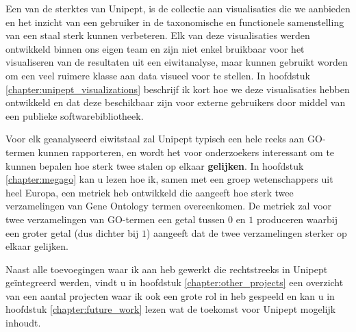 Een van de sterktes van Unipept, is de collectie aan visualisaties die we aanbieden en het inzicht van een gebruiker in de taxonomische en functionele samenstelling van een staal sterk kunnen verbeteren.
Elk van deze visualisaties werden ontwikkeld binnen ons eigen team en zijn niet enkel bruikbaar voor het visualiseren van de resultaten uit een eiwitanalyse, maar kunnen gebruikt worden om een veel ruimere klasse aan data visueel voor te stellen.
In hoofdstuk \ref{chapter:unipept_visualizations} beschrijf ik kort hoe we deze visualisaties hebben ontwikkeld en dat deze beschikbaar zijn voor externe gebruikers door middel van een publieke softwarebibliotheek.

Voor elk geanalyseerd eiwitstaal zal Unipept typisch een hele reeks aan GO-termen kunnen rapporteren, en wordt het voor onderzoekers interessant om te kunnen bepalen hoe sterk twee stalen op elkaar \textbf{gelijken}.
In hoofdstuk \ref{chapter:megago} kan u lezen hoe ik, samen met een groep wetenschappers uit heel Europa, een metriek heb ontwikkeld die aangeeft hoe sterk twee verzamelingen van Gene Ontology termen overeenkomen.
De metriek zal voor twee verzamelingen van GO-termen een getal tussen $0$ en $1$ produceren waarbij een groter getal (dus dichter bij $1$) aangeeft dat de twee verzamelingen sterker op elkaar gelijken.

Naast alle toevoegingen waar ik aan heb gewerkt die rechtstreeks in Unipept geïntegreerd werden, vindt u in hoofdstuk \ref{chapter:other_projects} een overzicht van een aantal projecten waar ik ook een grote rol in heb gespeeld en kan u in hoofdstuk \ref{chapter:future_work} lezen wat de toekomst voor Unipept mogelijk inhoudt.

